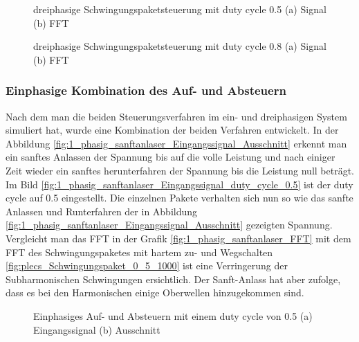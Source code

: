 \begin{figure}[ht!]
	\centering
	\qquad
	\caption{dreiphasige Schwingungspaketsteuerung mit duty cycle 0.5 (a) Signal (b) FFT}
	\label{fig:3_phasiges_Schwingungspaket_0_5}
\end{figure}



\begin{figure}[ht!]
	\centering
	\qquad
	\caption{dreiphasige Schwingungspaketsteuerung mit duty cycle 0.8 (a) Signal (b) FFT}
	\label{fig:3_phasiges_Schwingungspaket_0_8}
\end{figure}

\newpage
\subsubsection{Einphasige Kombination des Auf- und Absteuern}

Nach dem man die beiden Steuerungsverfahren im ein- und dreiphasigen System simuliert hat, wurde eine Kombination der beiden Verfahren entwickelt. In der Abbildung \ref{fig:1_phasig_sanftanlaser_Eingangssignal_Ausschnitt} erkennt man ein sanftes Anlassen der Spannung bis auf die volle Leistung und nach einiger Zeit wieder ein sanftes herunterfahren der Spannung bis die Leistung null beträgt. Im Bild \ref{fig:1_phasig_sanftanlaser_Eingangssignal_duty_cycle_0.5} ist der duty cycle auf 0.5 eingestellt. Die einzelnen Pakete verhalten sich nun so wie das sanfte Anlassen und Runterfahren der in Abbildung \ref{fig:1_phasig_sanftanlaser_Eingangssignal_Ausschnitt} gezeigten Spannung. Vergleicht man das FFT in der Grafik \ref{fig:1_phasig_sanftanlaser_FFT} mit dem FFT des Schwingungspaketes mit hartem zu- und Wegschalten \ref{fig:plecs_Schwingungspaket_0_5_1000} ist eine Verringerung der Subharmonischen Schwingungen ersichtlich. Der Sanft-Anlass hat aber zufolge, dass  es bei den Harmonischen einige Oberwellen hinzugekommen sind. 

\begin{figure}[ht!]
	\centering
	\qquad
	\caption{Einphasiges Auf- und Absteuern mit einem duty cycle von 0.5 (a) Eingangssignal (b) Ausschnitt}
	\label{fig:einphasiges_Sanft_anlassen_Einganssignal}
\end{figure}

